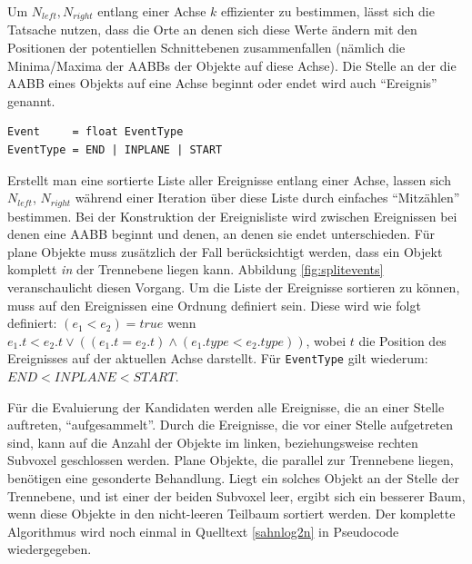 Um $N_{left}, N_{right}$ entlang einer Achse $k$ effizienter zu bestimmen, lässt sich die Tatsache nutzen, dass die Orte an denen sich diese Werte ändern mit den Positionen der potentiellen Schnittebenen zusammenfallen (nämlich die Minima/Maxima der AABBs der Objekte auf diese Achse). Die Stelle an der die AABB eines Objekts auf eine Achse beginnt oder endet wird auch ``Ereignis'' genannt.

\begin{lstlisting}[belowcaptionskip=12pt,float,mathescape=true,caption={[Definition des Ereignisdatentyps für die Kandidatengenerierung]Ereignisse bestehen aus einer Position $t$ und einer Kennzeichnung ob bei dieser Position ein Objekt beginnt oder endet. Für plane Objekte kann noch der Spezialfall eintreten, dass das Objekt komplett in eine Schnittebene an dieser Stelle fallen würde.},label=event]
Event     = float EventType
EventType = END | INPLANE | START 
\end{lstlisting}

Erstellt man eine sortierte Liste aller Ereignisse entlang einer Achse, lassen sich $N_{left}$, $N_{right}$ während einer Iteration über diese Liste durch einfaches ``Mitzählen'' bestimmen. Bei der Konstruktion der Ereignisliste wird zwischen Ereignissen bei denen eine AABB beginnt und denen, an denen sie endet unterschieden. Für plane Objekte muss zusätzlich der Fall berücksichtigt werden, dass ein Objekt komplett \textit{in} der Trennebene liegen kann. Abbildung \ref{fig:splitevents} veranschaulicht diesen Vorgang.
Um die Liste der Ereignisse sortieren zu können, muss auf den Ereignissen eine Ordnung definiert sein. Diese wird wie folgt definiert: $ (e_1 < e_2) = true$ wenn $e_1.t < e_2.t \lor ( (e_1.t = e_2.t) \land (e_1.type < e_2.type))$, wobei $t$ die Position des Ereignisses auf der aktuellen Achse darstellt. Für \verb|EventType| gilt wiederum: ${END} < {INPLANE} < {START}$.

Für die Evaluierung der Kandidaten werden alle Ereignisse, die an einer Stelle auftreten, ``aufgesammelt''. Durch die Ereignisse, die vor einer Stelle aufgetreten sind, kann auf die Anzahl der Objekte im linken, beziehungsweise rechten Subvoxel geschlossen werden. Plane Objekte, die parallel zur Trennebene liegen, benötigen eine gesonderte Behandlung. Liegt ein solches Objekt an der Stelle der Trennebene, und ist einer der beiden Subvoxel leer, ergibt sich ein besserer Baum, wenn diese Objekte in den nicht-leeren Teilbaum sortiert werden. Der komplette Algorithmus wird noch einmal in Quelltext \ref{sahnlog2n} in Pseudocode wiedergegeben.

